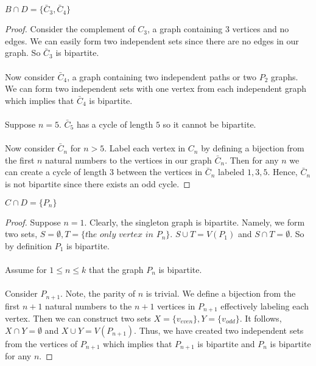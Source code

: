 \documentclass{article}
\newenvironment{claim}[2][Claim]{\begin{trivlist}
		\item[\hskip \labelsep {\bfseries #1}\hskip \labelsep {\bfseries #2}]}{\end{trivlist}}
\begin{document}
\begin{claim}{}
$B \cap D = \{ \bar C_3, \bar C_4 \}$
\end{claim}
\begin{proof}
Consider the complement of $C_3$, a graph containing $3$ vertices and no edges. We can easily form two independent sets since there are no edges in our graph. So $\bar C_3$ is bipartite.\\ \\
Now consider $\bar C_4$, a graph containing two independent paths or two $P_2$ graphs. We can form two independent sets with one vertex from each independent graph which implies that $\bar C_4$ is bipartite. \\ \\
Suppose $n = 5$. $\bar C_5$ has a cycle of length $5$ so it cannot be bipartite. \\ \\
Now consider $\bar C_n$ for $n > 5$. Label each vertex in $C_n$ by defining a bijection from the first $n$ natural numbers to the vertices in our graph $\bar C_n$. Then for any $n$ we can create a cycle of length $3$ between the vertices in $\bar C_n$ labeled $1,3,5$. Hence, $\bar C_n$ is not bipartite since there exists an odd cycle.

\end{proof}
\newpage
\begin{claim}{}
$C \cap D = \{ P_n \}$
\end{claim}
\begin{proof}
Suppose $n = 1$. Clearly, the singleton graph is bipartite. Namely, we form two sets, $S = \emptyset, T = \{ \textit{the only vertex in } P_n\}$. $S \cup T = V(P_1)$ and $S \cap T = \emptyset$. So by definition $P_1$ is bipartite. \\ \\
Assume for $1 \leq n \leq k$ that the graph $P_n$ is bipartite. \\ \\
Consider $P_{n + 1}$. Note, the parity of $n$ is trivial. We define a bijection from the first $n + 1$ natural numbers to the $n + 1$ vertices in $P_{n + 1}$ effectively labeling each vertex. Then we can construct two sets $X = \{ v_\textit{even} \}, Y = \{ v_\textit{odd} \}$. It follows, $X \cap Y = \emptyset$ and $X \cup Y = V(P_{n + 1})$. Thus, we have created two independent sets from the vertices of $P_{n + 1}$ which implies that $P_{n+1}$ is bipartite and $P_n$ is bipartite for any $n$. 
\end{proof}
\end{document}
